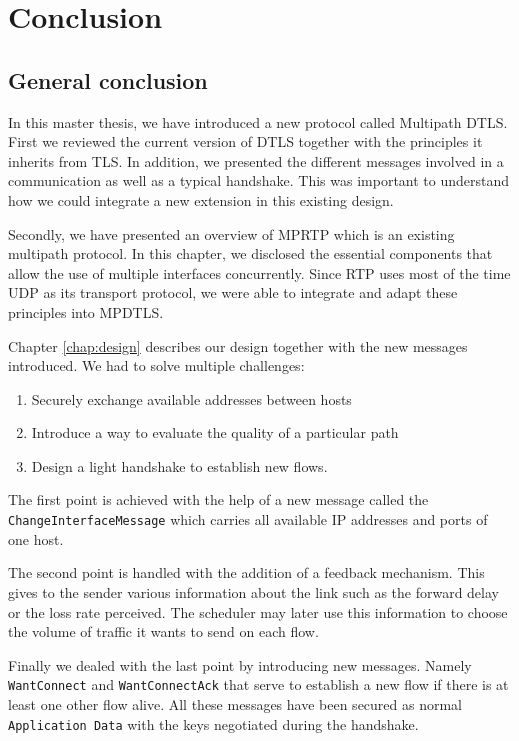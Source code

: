\chapter{Conclusion}

\section{General conclusion}

In this master thesis, we have introduced a new protocol called Multipath DTLS. First we reviewed the current version of DTLS together with the principles it inherits from TLS. In addition, we presented the different messages involved in a communication as well as a typical handshake. This was important to understand how we could integrate a new extension in this existing design.

Secondly, we have presented an overview of MPRTP which is an existing multipath protocol. In this chapter, we disclosed the essential components that allow the use of multiple interfaces concurrently. Since RTP uses most of the time UDP as its transport protocol, we were able to integrate and adapt these principles into MPDTLS.

Chapter \ref{chap:design} describes our design together with the new messages introduced. We had to solve multiple challenges:

\begin{enumerate}
\item Securely exchange available addresses between hosts
\item Introduce a way to evaluate the quality of a particular path
\item Design a light handshake to establish new flows.
\end{enumerate}

The first point is achieved with the help of a new message called the \texttt{ChangeInterfaceMessage} which carries all available IP addresses and ports of one host.

The second point is handled with the addition of a feedback mechanism. This gives to the sender various information about the link such as the forward delay or the loss rate perceived. The scheduler may later use this information to choose the volume of traffic it wants to send on each flow.

Finally we dealed with the last point by introducing new messages. Namely \texttt{WantConnect} and \texttt{WantConnectAck} that serve to establish a new flow if there is at least one other flow alive. All these messages have been secured as normal \texttt{Application Data} with the keys negotiated during the handshake.

